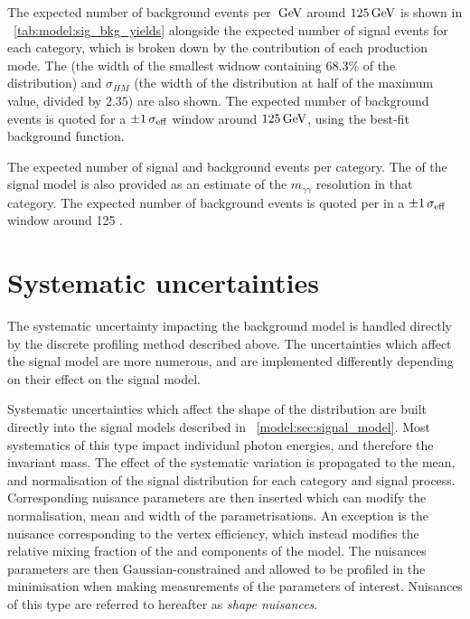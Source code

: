 The expected number of background events per $\,\text{Ge\hspace{-.08em}V}$ around $125\,\text{Ge\hspace{-.08em}V}$ is shown in \Table~\ref{tab:model:sig_bkg_yields} alongside the expected number of signal events for each category, which is broken down by the contribution of each production mode. The \effSigma (the width of the smallest widnow containing $68.3\%$ of the distribution) and $\sigma_{HM}$ (the width of the distribution at half of the maximum value, divided by $2.35$) are also shown. The expected number of background events is quoted for a $\pm 1 \,\sigma_{\text{eff}}$ window around $125\,\text{Ge\hspace{-.08em}V}$, using the best-fit background function.

 \begin{table}
  \resizebox{\textwidth}{!}{

}
 \caption{ The expected number of signal and background events per category. The \effSigma of the signal model is also provided as an estimate of the $m_{\gamma\gamma}$ resolution in that category. The expected number of background events is quoted per \GeV in a $\pm 1 \,\sigma_{\text{eff}}$ window around 125 \GeV.}
 \label{tab:model:sig_bkg_yields}
\end{table}

\section{Systematic uncertainties}
\label{model:sec:systematics}

The systematic uncertainty impacting the background model is handled directly by the discrete profiling method described above. The uncertainties which affect the signal model are more numerous, and are implemented differently depending on their effect on the signal model.

Systematic uncertainties which affect the shape of the \mgg distribution are built directly into the signal models described in \Sec~\ref{model:sec:signal_model}. Most systematics of this type impact individual photon energies, and therefore the invariant mass. The effect of the systematic variation is propagated to the mean, \effSigma and normalisation of the signal \mgg distribution for each category and signal process. Corresponding nuisance parameters are then inserted which can modify the normalisation, mean and width of the \DCBpG parametrisations. An exception is the nuisance corresponding to the vertex efficiency, which instead modifies the relative mixing fraction of the \RV and \WV components of the model. The nuisances parameters are then Gaussian-constrained and allowed to be profiled in the \NLL minimisation when making measurements of the parameters of interest. Nuisances of this type are referred to hereafter as \emph{shape nuisances}. 

